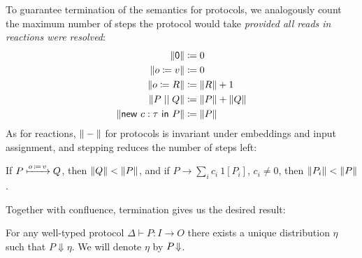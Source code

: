 \noindent To guarantee termination of the semantics for protocols, we analogously count the maximum number of steps the protocol would take \emph{provided all reads in reactions were resolved}:
\begin{align*}
\Vert \mathsf{0} \Vert & \coloneqq 0 \\
\Vert o \coloneqq v \Vert & \coloneqq 0 \\
\Vert o \coloneqq R \Vert & \coloneqq \Vert R \Vert + 1 \\
\Vert P \; || \; Q \Vert & \coloneqq \Vert P \Vert + \Vert Q \Vert \\
\Vert \mathsf{new} \ c : \tau \ \mathsf{in} \ P \Vert & \coloneqq \Vert P \Vert
\end{align*}
As for reactions, $\Vert - \Vert$ for protocols is invariant under embeddings and input assignment, and stepping reduces the number of steps left:

\begin{lemma}
If $P \xmapsto{o \, \coloneqq \, v} Q$, then $\Vert Q \Vert < \Vert P \Vert$, and if $P \to \sum_i c_i \ 1[P_i]$, $c_i \neq 0$, then $\Vert P_i \Vert < \Vert P \Vert$.
\end{lemma}

\noindent Together with confluence, termination gives us the desired result:

\begin{corollary}
For any well-typed protocol $\Delta \vdash P : I \to O$ there exists a unique distribution $\eta$ such that $P \Downarrow \eta$. We will denote $\eta$ by $P \! \Downarrow$.
\end{corollary}